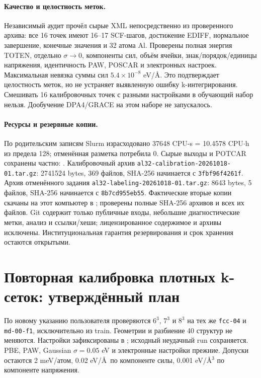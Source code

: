 \documentclass[11pt,a4paper]{article}
\begin{document}
\paragraph{Качество и целостность меток.} Независимый аудит прочёл сырые XML
непосредственно из проверенного архива: все 16 точек имеют 16--17 SCF-шагов,
достижение EDIFF, нормальное завершение, конечные значения и 32 атома Al.
Проверены полная энергия TOTEN, отдельно $\sigma\to0$, компоненты сил,
объём ячейки, знак/порядок/единицы напряжения, идентичность PAW,
POSCAR и электронных настроек. Максимальная невязка суммы сил
$5.4\times10^{-8}$ eV/\AA. Это подтверждает целостность меток,
но не устраняет выявленную ошибку k-интегрирования.
Смешивать 16 калибровочных точек с разными настройками в обучающий набор нельзя.
Дообучение DPA4/GRACE на этом наборе не запускалось.

\paragraph{Ресурсы и резервные копии.} По родительским записям Slurm
израсходовано 37648 CPU-s = 10.4578 CPU$\cdot$h из предела 128;
отменённая разметка потребила 0. Сырые выходы и POTCAR сохранены частно:
.
Калибровочный архив \texttt{al32-calibration-20261018-01.tar.gz}:
2741524 bytes, 369 файлов, SHA-256 начинается с \texttt{3fbf96f4261f}.
Архив отменённого задания \texttt{al32-labeling-20261018-01.tar.gz}:
8643 bytes, 5 файлов, SHA-256 начинается с \texttt{8b7cd955eb55}.
Фактические вторые копии скачаны на этот компьютер в
; проверены полные SHA-256 архивов и всех
их файлов. Git содержит только публичные входы, небольшие диагностические
метки, анализ и ссылки/хеши; лицензированное содержимое и архивы исключены.
Институциональная гарантия резервирования и срок хранения остаются открытыми.

\section{Повторная калибровка плотных k-сеток: утверждённый план}
По новому указанию пользователя проверяются $6^3$, $7^3$ и $8^3$ на
тех же \texttt{fcc-04} и \texttt{md-00-f1}, исключительно из train.
Геометрии и разбиение 40 структур не меняются. Настройки зафиксированы в
; исходный неудачный run сохраняется.
PBE, PAW, Gaussian $\sigma=0.05$ eV и электронные настройки прежние.
Допуски остаются 2 meV/атом, 0.02 eV/\AA\ по компоненте силы,
0.001 eV/\AA$^3$ по компоненте напряжения.
\end{document}
